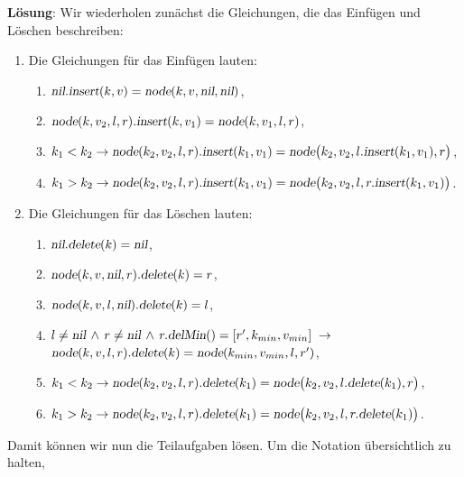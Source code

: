 \documentclass{article}
\renewcommand{\labelenumi}{(\alph{enumi})}
\begin{document}
\noindent
\textbf{L\"osung}:
Wir wiederholen zun\"achst die Gleichungen, die das Einf\"ugen und L\"oschen beschreiben:
\begin{enumerate}
\renewcommand{\labelenumi}{\arabic{enumi}.}
\item Die Gleichungen f\"ur das Einf\"ugen lauten:
  \begin{enumerate}
  \item $\textsl{nil}\mathtt{.}\textsl{insert}(k,v) = \textsl{node}(k,v, \textsl{nil}, \textsl{nil})$,
  \item $\textsl{node}(k, v_2, l, r)\mathtt{.}\textsl{insert}(k,v_1) = \textsl{node}(k, v_1, l, r)$,
  \item $k_1 < k_2 \rightarrow 
          \textsl{node}(k_2, v_2, l, r)\mathtt{.}\textsl{insert}(k_1, v_1) =
          \textsl{node}\bigl(k_2, v_2, l\mathtt{.}\textsl{insert}(k_1, v_1), r\bigr)$,
  \item $k_1 > k_2 \rightarrow 
         \textsl{node}(k_2, v_2, l, r)\mathtt{.}\textsl{insert}(k_1, v_1) = 
         \textsl{node}\bigl(k_2, v_2, l, r\mathtt{.}\textsl{insert}(k_1, v_1)\bigr)$.
\end{enumerate}
\item Die Gleichungen f\"ur das L\"oschen lauten:
  \begin{enumerate}
  \item $\textsl{nil}\mathtt{.}\textsl{delete}(k) = \textsl{nil}$,
  \item $\textsl{node}(k,v,\textsl{nil},r)\mathtt{.}\textsl{delete}(k) = r$,
  \item $\textsl{node}(k,v,l,\textsl{nil})\mathtt{.}\textsl{delete}(k) = l$,
  \item $l \not= \textsl{nil} \,\wedge\, r \not= \textsl{nil} \,\wedge\, r\mathtt{.}\textsl{delMin}() = [r',k_{min}, v_{min}]  \;\rightarrow$ \\[0.1cm]
      \hspace*{1.3cm}
      $\textsl{node}(k,v,l,r)\mathtt{.}\textsl{delete}(k) = \textsl{node}(k_{min},v_{min},l,r')$,
  \item $k_1 < k_2 \rightarrow \textsl{node}(k_2,v_2,l,r)\mathtt{.}\textsl{delete}(k_1) = 
       \textsl{node}\bigl(k_2,v_2,l\mathtt{.}\textsl{delete}(k_1),r\bigr)$,
  \item $k_1 > k_2 \rightarrow \textsl{node}(k_2,v_2,l,r)\mathtt{.}\textsl{delete}(k_1) = 
       \textsl{node}\bigl(k_2,v_2,l,r\mathtt{.}\textsl{delete}(k_1)\bigr)$.
\end{enumerate}
\end{enumerate}
Damit k\"onnen wir nun die Teilaufgaben l\"osen.  Um die Notation \"ubersichtlich zu halten,
\end{document}
